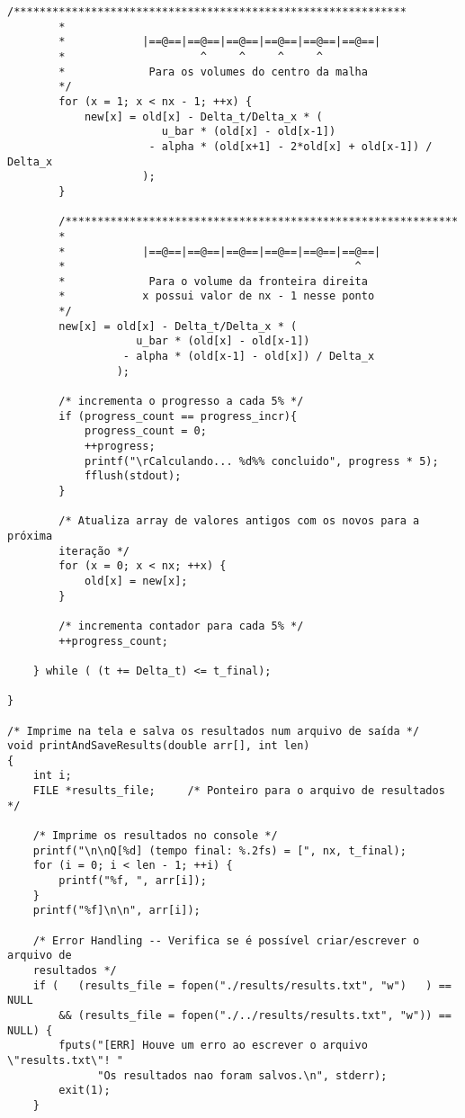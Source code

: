 \begin{Verbatim}[fontsize=\footnotesize]
        /*************************************************************
        *
        *            |==@==|==@==|==@==|==@==|==@==|==@==|
        *                     ^     ^     ^     ^
        *             Para os volumes do centro da malha
        */
        for (x = 1; x < nx - 1; ++x) {
            new[x] = old[x] - Delta_t/Delta_x * (
                        u_bar * (old[x] - old[x-1])
                      - alpha * (old[x+1] - 2*old[x] + old[x-1]) / Delta_x
                     );
        }

        /*************************************************************
        *
        *            |==@==|==@==|==@==|==@==|==@==|==@==|
        *                                             ^
        *             Para o volume da fronteira direita
        *            x possui valor de nx - 1 nesse ponto
        */
        new[x] = old[x] - Delta_t/Delta_x * (
                    u_bar * (old[x] - old[x-1])
                  - alpha * (old[x-1] - old[x]) / Delta_x
                 );

        /* incrementa o progresso a cada 5% */
        if (progress_count == progress_incr){
            progress_count = 0;
            ++progress;
            printf("\rCalculando... %d%% concluido", progress * 5);
            fflush(stdout);
        }

        /* Atualiza array de valores antigos com os novos para a próxima
        iteração */
        for (x = 0; x < nx; ++x) {
            old[x] = new[x];
        }

        /* incrementa contador para cada 5% */
        ++progress_count;

    } while ( (t += Delta_t) <= t_final);

}

/* Imprime na tela e salva os resultados num arquivo de saída */
void printAndSaveResults(double arr[], int len)
{
    int i;
    FILE *results_file;     /* Ponteiro para o arquivo de resultados */

    /* Imprime os resultados no console */
    printf("\n\nQ[%d] (tempo final: %.2fs) = [", nx, t_final);
    for (i = 0; i < len - 1; ++i) {
        printf("%f, ", arr[i]);
    }
    printf("%f]\n\n", arr[i]);

    /* Error Handling -- Verifica se é possível criar/escrever o arquivo de
    resultados */
    if (   (results_file = fopen("./results/results.txt", "w")   ) == NULL
        && (results_file = fopen("./../results/results.txt", "w")) == NULL) {
        fputs("[ERR] Houve um erro ao escrever o arquivo \"results.txt\"! "
              "Os resultados nao foram salvos.\n", stderr);
        exit(1);
    }


\end{Verbatim}
